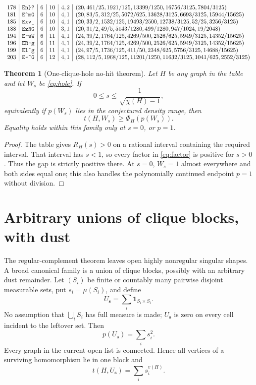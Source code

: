 \documentclass[11pt]{article}
\newtheorem{theorem}{Theorem}[section]
\begin{document}
\[\begin{array}{c|c|c|c|c|l}
178&\texttt{En\char`\}?}&6&10&4,2&(20,461/25,1921/125,13399/1250,16756/3125,7804/3125)\\
181&\texttt{E\char`\^mG}&6&10&4,1&(20,83/5,312/25,5072/625,13628/3125,6693/3125,15944/15625)\\
185&\texttt{Exv\_}&6&10&4,1&(20,33/2,1532/125,19493/2500,12738/3125,52/25,3256/3125)\\
188&\texttt{EzNG}&6&10&3,1&(20,31/2,49/5,5143/1280,499/1280,947/1024,19/2048)\\
194&\texttt{E\char`\~wW}&6&11&4,1&(24,39/2,1764/125,4269/500,2526/625,5949/3125,14352/15625)\\
196&\texttt{ER\char`\~g}&6&11&4,1&(24,39/2,1764/125,4269/500,2526/625,5949/3125,14352/15625)\\
199&\texttt{El\char`\^g}&6&11&4,1&(24,97/5,1736/125,411/50,2348/625,5756/3125,14688/15625)\\
203&\texttt{E\char`\~\char`\^G}&6&12&4,1&(28,112/5,1968/125,11201/1250,11632/3125,1041/625,2552/3125)
\end{array}
\]
\normalsize

\begin{theorem}[One-clique-hole no-hit theorem]\label{thm:no-hit}
Let $H$ be any graph in the table and let $W_s$ be \eqref{eq:hole}.  If
\[
 0\leq s\leq\frac1{\sqrt{\chi(H)-1}},
\]
equivalently if $p(W_s)$ lies in the conjectured density range, then
\[
 t(H,W_s)\geq\Phi_H(p(W_s)).
\]
Equality holds within this family only at $s=0$, or $p=1$.
\end{theorem}

\begin{proof}
The table gives $R_H(s)>0$ on a rational interval containing the required
interval.  That interval has $s<1$, so every factor in
\eqref{eq:factor} is positive for $s>0$.  Thus the gap is strictly positive
there.  At $s=0$, $W_s=1$ almost everywhere and both sides equal one; this
also handles the polynomially continued endpoint $p=1$ without division.
\end{proof}

\section{Arbitrary unions of clique blocks, with dust}

The regular-complement theorem leaves open highly nonregular singular
shapes.  A broad canonical family is a union of clique blocks, possibly with
an arbitrary dust remainder.  Let $(S_i)$ be finite or countably many
pairwise disjoint measurable sets, put $s_i=\mu(S_i)$, and define
\[
 U_{\boldsymbol s}=\sum_i\mathbf1_{S_i\times S_i}.
 \label{eq:clique-union}
\]
No assumption that $\bigcup_iS_i$ has full measure is made; $U_{\boldsymbol s}$
is zero on every cell incident to the leftover set.  Then
\[
 p(U_{\boldsymbol s})=\sum_i s_i^2.
\]
Every graph in the current open list is connected.  Hence all vertices of a
surviving homomorphism lie in one block and
\begin{equation}
 t(H,U_{\boldsymbol s})=\sum_i s_i^{v(H)}.
 \label{eq:clique-union-density}
\end{equation}
\end{document}
